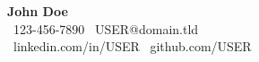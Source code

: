\begin{center}
{\LARGE\textbf{\color{darkblue}John Doe}} \\
\vspace{6pt}
\textcolor{mediumgray}{
    \faPhone\ 123-456-7890 \quad
    \faEnvelope\ USER@domain.tld \\
    \vspace{2pt}
    \faLinkedin\ linkedin.com/in/USER \quad
    \faGithub\ github.com/USER
}
\end{center}
\vspace{10pt}